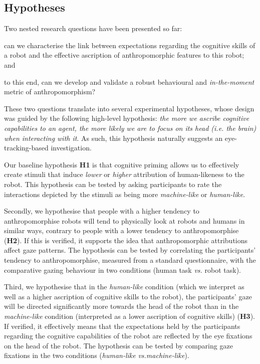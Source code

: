 \documentclass[lettersize, noapacite, twoside, HRI]{apa_HRI}
\newcommand{\ie}{\textit{i.e.}\xspace}
\newcommand{\vs}{\textit{vs.}\xspace}
\newcommand{\h}[1]{\textbf{H#1}\xspace}
\begin{document}
\subsection{Hypotheses}

\begin{inparaenum}
Two nested research questions have been presented so far: \item can we
characterise the link between expectations regarding the cognitive
skills of a robot and the effective ascription of anthropomorphic features to
this robot; and \item to this end, can we develop and validate a robust behavioural and
\emph{in-the-moment} metric of anthropomorphism?  \end{inparaenum}

These two questions translate into several experimental hypotheses, whose design
was guided by the following high-level hypothesis: \emph{the more we ascribe cognitive
capabilities to an agent, the more likely we are to focus on its head (\ie the
brain) when interacting with it}. As such, this hypothesis naturally suggests an
eye-tracking-based investigation.



Our baseline hypothesis \h{1} is that cognitive priming allows us to effectively create
stimuli that induce \emph{lower} or \emph{higher} attribution of human-likeness
to the robot. This hypothesis can be tested by asking
participants to rate the interactions depicted by the stimuli as being more
\emph{machine-like} or \emph{human-like}.

Secondly, we hypothesise that people with a higher tendency to anthropomorphise
robots will tend to physically look at robots and humans in similar ways, contrary to
people with a lower tendency to anthropomorphise (\h{2}). If this is verified,
it supports the idea that anthropomorphic attributions affect gaze patterns. The
hypothesis can be tested by correlating the participants' tendency to
anthropomorphise, measured from a standard questionnaire, with the comparative
gazing behaviour in two conditions (human task \vs robot task).

Third, we hypothesise that in the \emph{human-like} condition (which we
interpret as well as a higher ascription of cognitive skills to the robot), the participants' gaze will be directed
significantly more towards the head of the robot than in the \emph{machine-like}
condition (interpreted as a lower ascription of cognitive skills) (\h{3}). If verified, it
effectively means that the expectations held by the participants regarding the
cognitive capabilities of the robot are reflected by the eye fixations on the
head of the robot.  The hypothesis can be tested by comparing gaze fixations in
the two conditions (\emph{human-like} \vs \emph{machine-like}).
\end{document}
